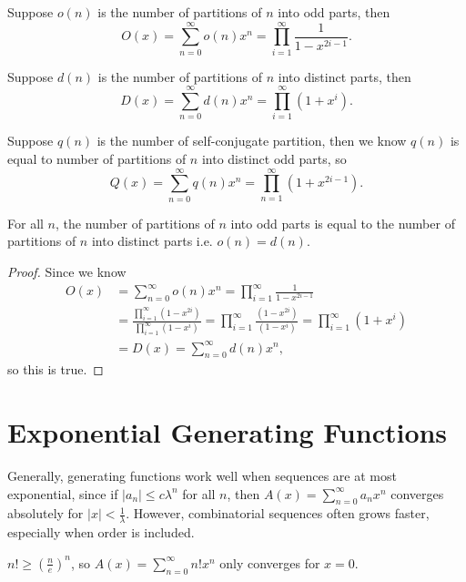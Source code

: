 \begin{eg}
    Suppose \(o(n)\) is the number of partitions of \(n\) into odd parts, then 
    \[
        O(x) = \sum_{n=0}^{\infty} o(n) x^n = \prod _{i=1}^{\infty} \frac{1}{1 - x^{2i - 1}}. 
    \]  
\end{eg}

\begin{eg}
    Suppose \(d(n)\) is the number of partitions of \(n\) into distinct parts, then 
    \[
        D(x) = \sum_{n=0}^{\infty} d(n) x^n = \prod _{i=1}^{\infty} \left( 1 + x^i \right).  
    \]  
\end{eg}

\begin{eg}
    Suppose \(q(n)\) is the number of self-conjugate partition, then we know \(q(n)\) is equal to number of partitions of \(n\) into distinct odd parts, so 
    \[
        Q(x) = \sum_{n=0}^{\infty} q(n)x^n = \prod _{n=1}^{\infty} \left( 1 + x^{2i - 1} \right).  
    \]   
\end{eg}

\begin{theorem}
    For all \(n\), the number of partitions of \(n\) into odd parts is equal to the number of partitions of \(n\) into distinct parts i.e. \(o(n) = d(n)\).    
\end{theorem}
\begin{proof}
    Since we know
    \begin{align*}
        O(x) &= \sum_{n=0}^{\infty} o(n) x^n = \prod _{i=1}^{\infty} \frac{1}{1 - x^{2i - 1}} \\
        &= \frac{\prod _{i=1}^{\infty} \left( 1 - x^{2i} \right) }{\prod _{i=1}^{\infty} \left( 1 - x^i \right) } = \prod _{i=1}^{\infty} \frac{\left( 1 - x^{2i} \right) }{\left( 1 - x^i \right) } = \prod _{i=1}^{\infty} \left( 1 + x^i \right) \\
        &= D(x) = \sum_{n=0}^{\infty} d(n) x^n, 
    \end{align*}
    so this is true.
\end{proof}

\section{Exponential Generating Functions}
Generally, generating functions work well when sequences are at most exponential, since if \(\vert a_n \vert \le c \lambda ^n\) for all \(n\), then \(A(x) = \sum_{n=0}^{\infty} a_n x^n \) converges absolutely for \(\vert x \vert < \frac{1}{\lambda } \). However, combinatorial sequences often grows faster, especially when order is included. 
\begin{eg}
    \(n! \ge \left( \frac{n}{e} \right)^n \), so \(A(x) = \sum_{n=0}^{\infty} n! x^n \) only converges for \(x = 0\).   
\end{eg}  

